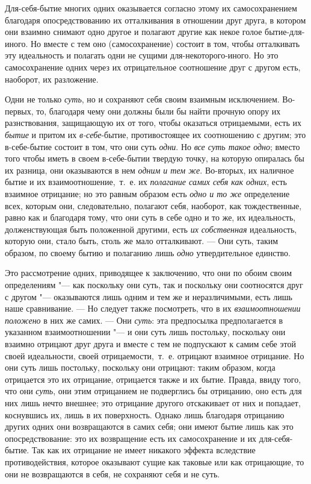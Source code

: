 Для-себя-бытие многих одних оказывается согласно этому их самосохранением
благодаря опосредствованию их отталкивания в отношении друг друга, в
котором они взаимно снимают одно другое и полагают другие как некое голое
бытие-для-иного. Но вместе с тем оно (самосохранение) состоит в том,
чтобы отталкивать эту идеальность и полагать одни не сущими 
для-некоторого-иного. Но это самосохранение одних через их отрицательное
соотношение друг с другом есть, наоборот, их разложение.

Одни не только {\em суть}, но и сохраняют себя своим
взаимным исключением. Во-первых, то, благодаря чему они должны были бы
найти прочную опору их разнствования, защищающую их от того, чтобы
оказаться отрицаемыми, есть их {\em бытие} и притом их
{\em в-себе}{}-бытие, противостоящее их соотношению с
другим; это в-себе-бытие состоит в том, что они суть
{\em одни}. Но {\em все суть такое
одно}; вместо того чтобы иметь в своем в-себе-бытии твердую точку, на
которую опиралась бы их разница, они оказываются в нем
{\em одним и тем же}. Во-вторых, их наличное бытие и их
взаимоотношение,~т.~е. их {\em полагание самих себя как
одних}, есть взаимное отрицание; но это равным образом есть
{\em одно и то же} определение всех, которым они,
следовательно, полагают себя, наоборот, как тождественные, равно как и
благодаря тому, что они суть в себе одно и то же, их идеальность,
долженствующая быть положенной другими, есть {\em их
собственная} идеальность, которую они, стало быть, столь же мало
отталкивают. — Они суть, таким образом, по своему бытию и полаганию лишь
{\em одно} утвердительное единство.

Это рассмотрение одних, приводящее к заключению, что они по обоим своим
определениям "--- как поскольку они суть, так и поскольку они соотносятся друг
с другом "--- оказываются лишь одним и тем же и неразличимыми, есть лишь наше
сравнивание. — Но следует также посмотреть, что в их
{\em взаимоотношении положено} в них же самих. — Они
{\em суть}: эта предпосылка предполагается в указанном
взаимоотношении "--- и они суть лишь постольку, поскольку они взаимно отрицают
друг друга и вместе с тем не подпускают к самим себе этой своей
идеальности, своей отрицаемости,~т.~е. отрицают взаимное отрицание. Но они
суть лишь постольку, поскольку они отрицают: таким образом, когда
отрицается это их отрицание, отрицается также и их бытие. Правда, ввиду
того, что они {\em суть}, они этим отрицанием не
подверглись бы отрицанию, оно есть для них лишь нечто внешнее; это
отрицание другого отскакивает от них и попадает, коснувшись их, лишь в их
поверхность. Однако лишь благодаря отрицанию других одних они возвращаются
в самих себя; они имеют бытие лишь как это опосредствование: это их
возвращение есть их самосохранение и их для-себя-бытие. Так как их
отрицание не имеет никакого эффекта вследствие противодействия, которое
оказывают сущие как таковые или как отрицающие, то они не возвращаются в
себя, не сохраняют себя и не суть.

